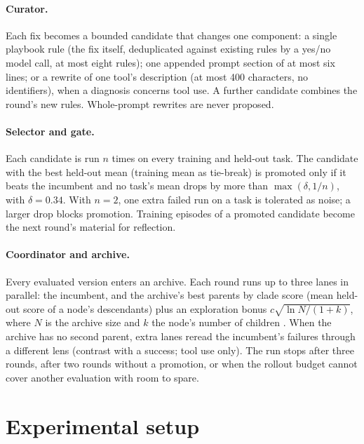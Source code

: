 \documentclass[11pt]{article}
\begin{document}
\paragraph{Curator.} Each fix becomes a bounded candidate that changes one component: a single playbook rule (the
fix itself, deduplicated against existing rules by a yes/no model call, at most eight rules); one appended prompt
section of at most six lines; or a rewrite of one tool's description (at most 400 characters, no identifiers), when a
diagnosis concerns tool use. A further candidate combines the round's new rules. Whole-prompt rewrites are never
proposed.

\paragraph{Selector and gate.} Each candidate is run $n$ times on every training and held-out task. The candidate
with the best held-out mean (training mean as tie-break) is promoted only if it beats the incumbent and no task's
mean drops by more than $\max(\delta, 1/n)$, with $\delta = 0.34$. With $n=2$, one extra failed run on a task is
tolerated as noise; a larger drop blocks promotion. Training episodes of a promoted candidate become the next
round's material for reflection.

\paragraph{Coordinator and archive.} Every evaluated version enters an archive. Each round runs up to three lanes in
parallel: the incumbent, and the archive's best parents by clade score (mean held-out score of a node's descendants)
plus an exploration bonus $c\sqrt{\ln N/(1+k)}$, where $N$ is the archive size and $k$ the node's number of children
\citep{hgm}. When the archive has no second parent, extra lanes reread the incumbent's failures through a different
lens (contrast with a success; tool use only). The run stops after three rounds, after two rounds without a
promotion, or when the rollout budget cannot cover another evaluation with room to spare.

\section{Experimental setup}
\label{sec:setup}
\end{document}
